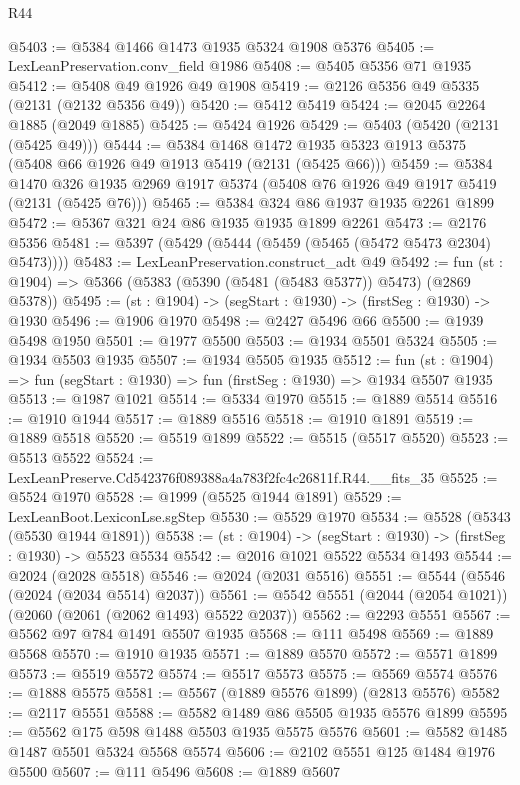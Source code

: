 \begin{lexlean}{R44}
\begin{coremodule}
@5403 := @5384 @1466 @1473 @1935 @5324 @1908 @5376
@5405 := LexLeanPreservation.conv_field @1986
@5408 := @5405 @5356 @71 @1935
@5412 := @5408 @49 @1926 @49 @1908
@5419 := @2126 @5356 @49 @5335 (@2131 (@2132 @5356 @49))
@5420 := @5412 @5419
@5424 := @2045 @2264 @1885 (@2049 @1885)
@5425 := @5424 @1926
@5429 := @5403 (@5420 (@2131 (@5425 @49)))
@5444 := @5384
    @1468
    @1472
    @1935
    @5323
    @1913
    @5375
    (@5408 @66 @1926 @49 @1913 @5419 (@2131 (@5425 @66)))
@5459 := @5384
    @1470
    @326
    @1935
    @2969
    @1917
    @5374
    (@5408 @76 @1926 @49 @1917 @5419 (@2131 (@5425 @76)))
@5465 := @5384 @324 @86 @1937 @1935 @2261 @1899
@5472 := @5367 @321 @24 @86 @1935 @1935 @1899 @2261
@5473 := @2176 @5356
@5481 := @5397 (@5429 (@5444 (@5459 (@5465 (@5472 @5473 @2304) @5473))))
@5483 := LexLeanPreservation.construct_adt @49
@5492 := fun (st : @1904) => @5366 (@5383 (@5390 (@5481 (@5483 @5377)) @5473) (@2869 @5378))
@5495 := (st : @1904) -> (segStart : @1930) -> (firstSeg : @1930) -> @1930
@5496 := @1906 @1970
@5498 := @2427 @5496 @66
@5500 := @1939 @5498 @1950
@5501 := @1977 @5500
@5503 := @1934 @5501 @5324
@5505 := @1934 @5503 @1935
@5507 := @1934 @5505 @1935
@5512 := fun (st : @1904) => fun (segStart : @1930) => fun (firstSeg : @1930) => @1934 @5507 @1935
@5513 := @1987 @1021
@5514 := @5334 @1970
@5515 := @1889 @5514
@5516 := @1910 @1944
@5517 := @1889 @5516
@5518 := @1910 @1891
@5519 := @1889 @5518
@5520 := @5519 @1899
@5522 := @5515 (@5517 @5520)
@5523 := @5513 @5522
@5524 := LexLeanPreserve.Cd542376f089388a4a783f2fc4c26811f.R44.__fits_35
@5525 := @5524 @1970
@5528 := @1999 (@5525 @1944 @1891)
@5529 := LexLeanBoot.LexiconLse.sgStep
@5530 := @5529 @1970
@5534 := @5528 (@5343 (@5530 @1944 @1891))
@5538 := (st : @1904) -> (segStart : @1930) -> (firstSeg : @1930) -> @5523 @5534
@5542 := @2016 @1021 @5522 @5534 @1493
@5544 := @2024 (@2028 @5518)
@5546 := @2024 (@2031 @5516)
@5551 := @5544 (@5546 (@2024 (@2034 @5514) @2037))
@5561 := @5542 @5551 (@2044 (@2054 @1021)) (@2060 (@2061 (@2062 @1493) @5522 @2037))
@5562 := @2293 @5551
@5567 := @5562 @97 @784 @1491 @5507 @1935
@5568 := @111 @5498
@5569 := @1889 @5568
@5570 := @1910 @1935
@5571 := @1889 @5570
@5572 := @5571 @1899
@5573 := @5519 @5572
@5574 := @5517 @5573
@5575 := @5569 @5574
@5576 := @1888 @5575
@5581 := @5567 (@1889 @5576 @1899) (@2813 @5576)
@5582 := @2117 @5551
@5588 := @5582 @1489 @86 @5505 @1935 @5576 @1899
@5595 := @5562 @175 @598 @1488 @5503 @1935 @5575 @5576
@5601 := @5582 @1485 @1487 @5501 @5324 @5568 @5574
@5606 := @2102 @5551 @125 @1484 @1976 @5500
@5607 := @111 @5496
@5608 := @1889 @5607

\end{coremodule}
\end{lexlean}
